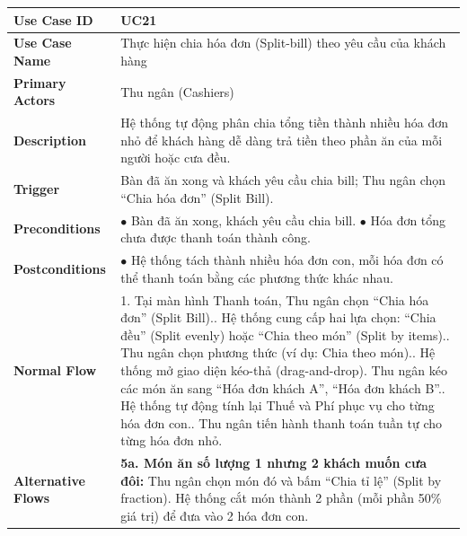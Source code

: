 \begin{longtable}{|L{3.5cm}|L{12.5cm}|}
\hline
\textbf{Use Case ID} & UC21 \\ \hline
\textbf{Use Case Name} & Thực hiện chia hóa đơn (Split-bill) theo yêu cầu của khách hàng \\ \hline
\textbf{Primary Actors} & Thu ngân (Cashiers) \\ \hline
\textbf{Description} & Hệ thống tự động phân chia tổng tiền thành nhiều hóa đơn nhỏ để khách hàng dễ dàng trả tiền theo phần ăn của mỗi người hoặc cưa đều. \\ \hline
\textbf{Trigger} & Bàn đã ăn xong và khách yêu cầu chia bill; Thu ngân chọn ``Chia hóa đơn'' (Split Bill). \\ \hline
\textbf{Preconditions} &
$\bullet$ Bàn đã ăn xong, khách yêu cầu chia bill.\newline
$\bullet$ Hóa đơn tổng chưa được thanh toán thành công. \\ \hline
\textbf{Postconditions} & $\bullet$ Hệ thống tách thành nhiều hóa đơn con, mỗi hóa đơn có thể thanh toán bằng các phương thức khác nhau. \\ \hline
\textbf{Normal Flow} &
1. Tại màn hình Thanh toán, Thu ngân chọn ``Chia hóa đơn'' (Split Bill).. Hệ thống cung cấp hai lựa chọn: ``Chia đều'' (Split evenly) hoặc ``Chia theo món'' (Split by items).. Thu ngân chọn phương thức (ví dụ: Chia theo món).. Hệ thống mở giao diện kéo-thả (drag-and-drop). Thu ngân kéo các món ăn sang ``Hóa đơn khách A'', ``Hóa đơn khách B''.. Hệ thống tự động tính lại Thuế và Phí phục vụ cho từng hóa đơn con.. Thu ngân tiến hành thanh toán tuần tự cho từng hóa đơn nhỏ. \\ \hline
\textbf{Alternative Flows} &
\textbf{5a. Món ăn số lượng 1 nhưng 2 khách muốn cưa đôi:} Thu ngân chọn món đó và bấm ``Chia tỉ lệ'' (Split by fraction). Hệ thống cắt món thành 2 phần (mỗi phần 50\% giá trị) để đưa vào 2 hóa đơn con. \\ \hline
\end{longtable}


